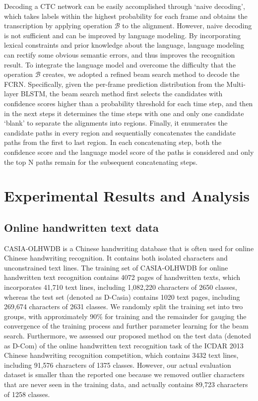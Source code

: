 \documentclass[10pt,conference,a4paper]{IEEEtran}
\begin{document}
Decoding a CTC network can be easily accomplished through `naive decoding'\cite{graves2012supervised}, which takes labels within the highest probability for each frame and obtains the transcription by applying operation $\mathscr{B}$ to the alignment.
However, naive decoding is not sufficient and can be improved by language modeling.
By incorporating lexical constraints and prior knowledge about the language, language modeling can rectify some obvious semantic errors, and thus improves the recognition result.
To integrate the language model and overcome the difficulty that the operation $\mathscr{B}$ creates, we adopted a refined beam search method to decode the FCRN.
Specifically, given the per-frame prediction distribution from the Multi-layer BLSTM,
the beam search method first selects the candidates with confidence scores higher than a probability threshold for each time step, and then in the next steps it determines the time steps with one and only one candidate `blank' to separate the alignments into regions.
Finally, it enumerates the candidate paths in every region and sequentially concatenates the candidate paths from the first to last region.
In each concatenating step, both the confidence score and the language model score of the paths is considered and only the top N paths remain for the subsequent concatenating steps.




\section{Experimental Results and Analysis}
\subsection{Online handwritten text data}
CASIA-OLHWDB\cite{liu2011casia} is a Chinese handwriting database that is often used for online Chinese handwriting recognition.
It contains both isolated characters and unconstrained text lines.
The training set of CASIA-OLHWDB for online handwritten text recognition contains 4072 pages of handwritten texts, which incorporates 41,710 text lines, including 1,082,220 characters of 2650 classes,
whereas the test set (denoted as D-Casia) contains 1020 text pages, including 269,674 characters of 2631 classes.
We randomly split the training set into two groups, with approximately 90\% for training and the remainder for gauging the convergence of the training process and further parameter learning for the beam search.
Furthermore, we assessed our proposed method on the test data (denoted as D-Com) of the online handwritten text recognition task of the ICDAR 2013 Chinese handwriting recognition competition\cite{liuicdar}, which contains 3432 text lines, including 91,576 characters of 1375 classes.
However, our actual evaluation dataset is smaller than the reported one because we removed outlier characters that are never seen in the training data, and actually contains 89,723 characters of 1258 classes.
\end{document}
